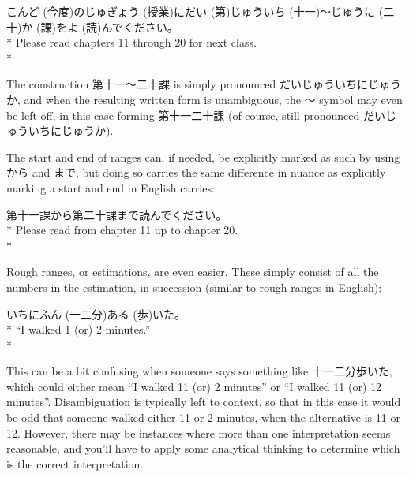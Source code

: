 \documentclass[11pt, b5paper, twoside, openright, onecolumn]{book}
\makeatletter
\newcommand*{\rubystack}[2]{{\relscale{0.5}%
  \begin{tabular}[b]{@{}c@{}}%
    {#1}\\%
   {\textscale{2}{#2}}%
  \end{tabular}}%
}
\DeclareRobustCommand*{\ruby}[2]{%
  \mbox{%
    \setlength{\parskip}{0ex}%
    \BeginAccSupp{method=pdfstringdef,ActualText={#1}}%
      \rubystack{\phantom{#2}}{#1}%
      \llap{%
        \rubystack{#2}{\phantom{#1}}%
      }%
    \EndAccSupp{}%
  }%
}
\renewcommand*{\ruby}[2]{#2 (#1)}%
\newenvironment{exampleblock}{
\setlength{\parindent}{0.6in}
\begin{minipage}[t]{\dimexpr\textwidth-\parindent}}
{\end{minipage}}
\makeatother
\begin{document}
\vspace{0.4cm}
\begin{exampleblock}
\ruby{今度}{こんど}の\ruby{授業}{じゅぎょう}に\ruby{第}{だい}\ruby{十一}{じゅういち}～\ruby{二十}{じゅうに}\ruby{課}{か}を\ruby{読}{よ}んでください。 \\* 
Please read chapters 11 through 20 for next class. \\* 
\end{exampleblock}
\vspace{0.2cm}

The construction 第十一～二十課 is simply pronounced だいじゅういちにじゅうか‚ and when the resulting written form is unambiguous‚ the ～ symbol may even be left off‚ in this case forming 第十一二十課 (of course‚ still pronounced だいじゅういちにじゅうか).

The start and end of ranges can‚ if needed‚ be explicitly marked as such by using から and まで‚ but doing so carries the same difference in nuance as explicitly marking a start and end in English carries:

\vspace{0.4cm}
\begin{exampleblock}
第十一課から第二十課まで読んでください。 \\* 
Please read from chapter 11 up to chapter 20. \\* 
\end{exampleblock}
\vspace{0.2cm}

Rough ranges‚ or estimations‚ are even easier. These simply consist of all the numbers in the estimation‚ in succession (similar to rough ranges in English):

\vspace{0.4cm}
\begin{exampleblock}
\ruby{一二分}{いちにふん}\ruby{歩}{ある}いた。 \\* 
“I walked 1 (or) 2 minutes.” \\* 
\end{exampleblock}
\vspace{0.2cm}

This can be a bit confusing when someone says something like 十一二分歩いた‚ which could either mean “I walked 11 (or) 2 minutes” or “I walked 11 (or) 12 minutes”. Disambiguation is typically left to context‚ so that in this case it would be odd that someone walked either 11 or 2 minutes‚ when the alternative is 11 or 12. However‚ there may be instances where more than one interpretation seems reasonable‚ and you’ll have to apply some analytical thinking to determine which is the correct interpretation.
\end{document}
